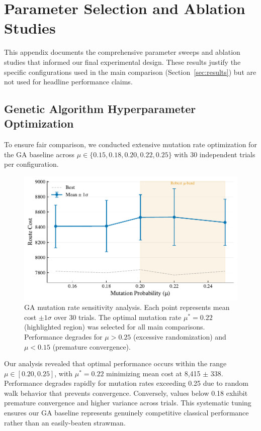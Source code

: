 \section{Parameter Selection and Ablation Studies}
\label{sec:appendix_parameters}

This appendix documents the comprehensive parameter sweeps and ablation studies that informed our final experimental design. These results justify the specific configurations used in the main comparison (Section~\ref{sec:results}) but are not used for headline performance claims.

\subsection{Genetic Algorithm Hyperparameter Optimization}
\label{sec:appendix_ga_tuning}

To ensure fair comparison, we conducted extensive mutation rate optimization for the GA baseline across $\mu \in \{0.15, 0.18, 0.20, 0.22, 0.25\}$ with 30 independent trials per configuration.

\begin{figure}[h]
  \centering
  \includegraphics[width=0.8\linewidth]{fig/01_ga_mutation_sweep.pdf}
  \caption{GA mutation rate sensitivity analysis. Each point represents mean cost $\pm 1\sigma$ over 30 trials. The optimal mutation rate $\mu^* = 0.22$ (highlighted region) was selected for all main comparisons. Performance degrades for $\mu > 0.25$ (excessive randomization) and $\mu < 0.15$ (premature convergence).}
  \label{fig:ga_mutation_sweep}
\end{figure}

Our analysis revealed that optimal performance occurs within the range $\mu \in [0.20, 0.25]$, with $\mu^* = 0.22$ minimizing mean cost at 8,415 $\pm$ 338. Performance degrades rapidly for mutation rates exceeding 0.25 due to random walk behavior that prevents convergence. Conversely, values below 0.18 exhibit premature convergence and higher variance across trials. This systematic tuning ensures our GA baseline represents genuinely competitive classical performance rather than an easily-beaten strawman.

